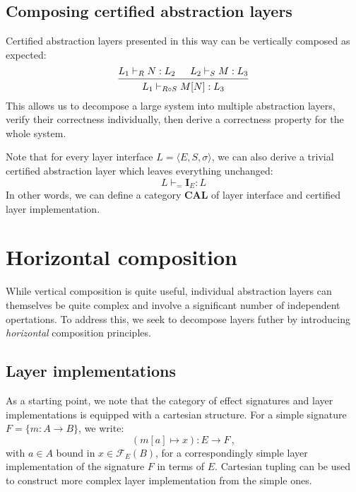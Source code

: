 \documentclass[draft,11pt]{report}
\theoremstyle{definition}
\begin{document}
\subsection{Composing certified abstraction layers} %

Certified abstraction layers presented in this way
can be vertically composed as expected:
\[
  \begin{prooftree}
    \hypo{L_1 \vdash_R N : L_2}
    \hypo{L_2 \vdash_S M : L_3}
    \infer2{L_1 \vdash_{R \circ S} M[N] : L_3}
  \end{prooftree}
\]
This allows us to decompose a large system
into multiple abstraction layers,
verify their correctness individually,
then derive a correctness property for the whole system.

Note that for every layer interface
$L = \langle E, S, \sigma \rangle$,
we can also derive a trivial certified abstraction layer
which leaves everything unchanged:
\[
  L \vdash_{=} \mathbf{I}_E : L
\]
In other words,
we can define a category $\mathbf{CAL}$
of layer interface and certified layer implementation.



\section{Horizontal composition} %

While vertical composition is quite useful,
individual abstraction layers can themselves be quite complex
and involve a significant number of independent opertations.
To address this,
we seek to decompose layers futher by introducing
\emph{horizontal} composition principles.

\subsection{Layer implementations} %

As a starting point,
we note that the category of effect signatures
and layer implementations
is equipped with a cartesian structure.
For a simple signature $F = \{ m : A \rightarrow B \}$,
we write:
\[ (m[a] \mapsto x) : E \rightarrow F \,, \]
with $a \in A$ bound in $x \in \mathcal{F}_E(B)$,
for a correspondingly simple layer implementation
of the signature $F$ in terms of $E$.
Cartesian tupling can be used to construct more complex
layer implementation from the simple ones.
\end{document}
